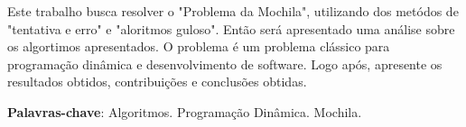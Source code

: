 
\imprimircapa

\imprimirfolhaderosto*










\setlength{\absparsep}{18pt} %
\begin{resumo}
Este trabalho busca resolver o "Problema da Mochila", utilizando dos metódos de "tentativa e erro" e "aloritmos guloso". Então será apresentado uma análise sobre os algortimos apresentados. O problema é um problema clássico para programação dinâmica e desenvolvimento de software.
Logo após, apresente os resultados obtidos, contribuições e conclusões obtidas.

 \textbf{Palavras-chave}: Algoritmos. Programação Dinâmica. Mochila.
\end{resumo}



\tableofcontents*
\cleardoublepage
